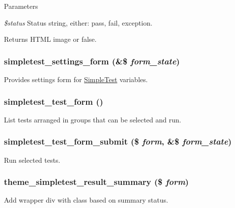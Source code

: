 \begin{DoxyParams}{Parameters}
\item[{\em \$status}]Status string, either: pass, fail, exception. \end{DoxyParams}
\begin{DoxyReturn}{Returns}
HTML image or false. 
\end{DoxyReturn}
\hypertarget{simpletest_8pages_8inc_a7ed68a2cea79c9d146dc370b3787defd}{
\subsubsection[{simpletest\_\-settings\_\-form}]{\setlength{\rightskip}{0pt plus 5cm}simpletest\_\-settings\_\-form (\&\$ {\em form\_\-state})}}
\label{simpletest_8pages_8inc_a7ed68a2cea79c9d146dc370b3787defd}
Provides settings form for \hyperlink{class_simple_test}{SimpleTest} variables. \hypertarget{simpletest_8pages_8inc_ab617b800aa9c77c9456131e0beb65bef}{
\subsubsection[{simpletest\_\-test\_\-form}]{\setlength{\rightskip}{0pt plus 5cm}simpletest\_\-test\_\-form ()}}
\label{simpletest_8pages_8inc_ab617b800aa9c77c9456131e0beb65bef}
List tests arranged in groups that can be selected and run. \hypertarget{simpletest_8pages_8inc_ae93012096feaf92ea177eaf496e51356}{
\subsubsection[{simpletest\_\-test\_\-form\_\-submit}]{\setlength{\rightskip}{0pt plus 5cm}simpletest\_\-test\_\-form\_\-submit (\$ {\em form}, \/  \&\$ {\em form\_\-state})}}
\label{simpletest_8pages_8inc_ae93012096feaf92ea177eaf496e51356}
Run selected tests. \hypertarget{simpletest_8pages_8inc_a367c96f8ea59a3c5b7e45a27fc420779}{
\subsubsection[{theme\_\-simpletest\_\-result\_\-summary}]{\setlength{\rightskip}{0pt plus 5cm}theme\_\-simpletest\_\-result\_\-summary (\$ {\em form})}}
\label{simpletest_8pages_8inc_a367c96f8ea59a3c5b7e45a27fc420779}
Add wrapper div with class based on summary status.

